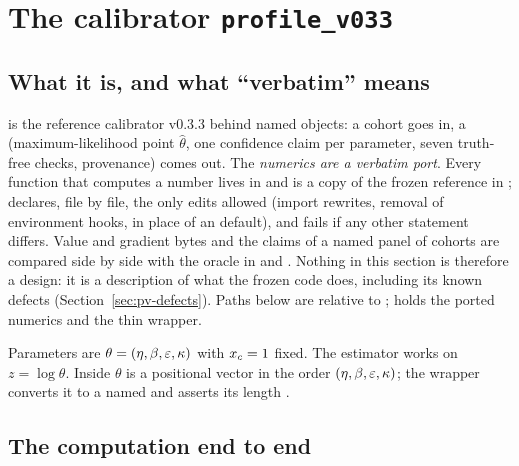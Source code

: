 \section{The calibrator \texttt{profile\_v033}}\label{sec:profile-v033}

\subsection{What it is, and what ``verbatim'' means}\label{sec:pv-intro}

 is the reference calibrator  v0.3.3 behind named objects: a cohort goes
in, a  (maximum-likelihood point $\hat\theta$, one confidence claim per parameter, seven
truth-free checks, provenance) comes out. The \emph{numerics are a verbatim port}. Every function that
computes a number lives in  and is a copy of the frozen reference in
;  declares, file by file, the only edits allowed (import
rewrites, removal of environment hooks,  in place of an  default), and
 fails if any other statement differs. Value and gradient bytes and the claims
of a named panel of cohorts are compared side by side with the oracle in  and
. Nothing in this section is therefore a design: it is a description of what the
frozen code does, including its known defects (Section~\ref{sec:pv-defects}). Paths below are relative to
;  holds the ported numerics and  the thin
wrapper.

Parameters are $\theta=(\eta,\beta,\varepsilon,\kappa)$ with $x_c=1$ fixed. The estimator works on
$z=\log\theta$. Inside  $\theta$ is a positional vector in the order
$(\eta,\beta,\varepsilon,\kappa)$; the wrapper converts it to a named  and asserts its length
.

\subsection{The computation end to end}\label{sec:pv-pipeline}

